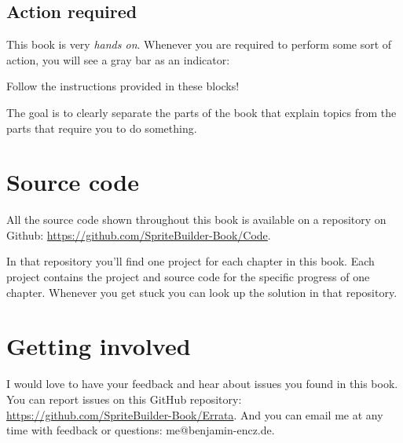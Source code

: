 \subsection{Action required}
This book is very \textit{hands on}. Whenever you are required to perform some
sort of action, you will see a gray bar as an indicator:

\begin{leftbar}
Follow the instructions provided in these blocks!
\end{leftbar}

The goal is to clearly separate the parts of the book that explain topics from
the parts that require you to do something.

\section{Source code}
All the source code shown throughout this book is available on a repository on
Github: \url{https://github.com/SpriteBuilder-Book/Code}. 

In that repository you'll find one project for each chapter in this book. Each
project contains the \SB{} project and source code for the specific progress of
one chapter. Whenever you get stuck you can look up the solution in that
repository.

\section{Getting involved}
I would love to have your feedback and hear about issues you found in this book.
You can report issues on this GitHub repository:
\url{https://github.com/SpriteBuilder-Book/Errata}. And you can email me at any
time with feedback or questions: me@benjamin-encz.de.